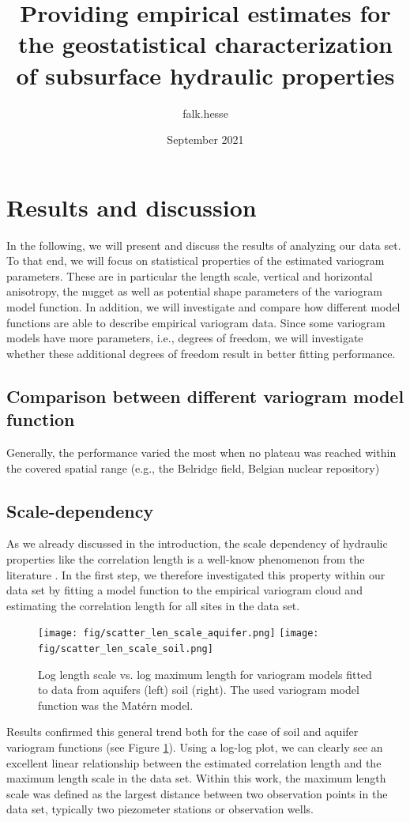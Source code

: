 \documentclass{article}
\title{Providing empirical estimates for the geostatistical characterization of subsurface hydraulic properties}
\author{falk.hesse }
\date{September 2021}
\begin{document}
\section{Results and discussion}

In the following, we will present and discuss the results of analyzing our data set. To that end, we will focus on statistical properties of the estimated variogram parameters. These are in particular the length scale, vertical and horizontal anisotropy, the nugget as well as potential shape parameters of the variogram model function. In addition, we will investigate and compare how different model functions are able to describe empirical variogram data. Since some variogram models have more parameters, i.e., degrees of freedom, we will investigate whether these additional degrees of freedom result in better fitting performance.


\subsection{Comparison between different variogram model function}

Generally, the performance varied the most when no plateau was reached within the covered spatial range (e.g., the Belridge field, Belgian nuclear repository)


\subsection{Scale-dependency}

As we already discussed in the introduction, the scale dependency of hydraulic properties like the correlation length is a well-know phenomenon from the literature \citep{Neuman2003, Neuman2008, Colecchio2020}. In the first step, we therefore investigated this property within our data set by fitting a model function to the empirical variogram cloud and estimating the correlation length for all sites in the data set. 

\begin{figure}[ht]
    \texttt{[image: fig/scatter\_len\_scale\_aquifer.png]}
    \texttt{[image: fig/scatter\_len\_scale\_soil.png]}
    \caption{Log length scale vs. log maximum length for variogram models fitted to data from aquifers (left) soil (right). The used variogram model function was the Mat{\'e}rn model.}
    \label{fig:scatter_len_scale}
\end{figure}

Results confirmed this general trend both for the case of soil and aquifer variogram functions (see Figure \ref{fig:scatter_len_scale}). Using a log-log plot, we can clearly see an excellent linear relationship between the estimated correlation length and the maximum length scale in the data set. Within this work, the maximum length scale was defined as the largest distance between two observation points in the data set, typically two piezometer stations or observation wells.
\end{document}

